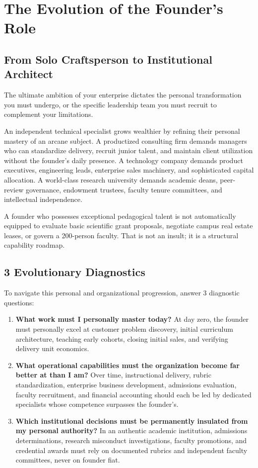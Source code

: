 \section{The Evolution of the Founder's Role}

\subsection{From Solo Craftsperson to Institutional Architect}

The ultimate ambition of your enterprise dictates the personal transformation you must undergo, or the specific leadership team you must recruit to complement your limitations.

An independent technical specialist grows wealthier by refining their personal mastery of an arcane subject. A productized consulting firm demands managers who can standardize delivery, recruit junior talent, and maintain client utilization without the founder's daily presence. A technology company demands product executives, engineering leads, enterprise sales machinery, and sophisticated capital allocation. A world-class research university demands academic deans, peer-review governance, endowment trustees, faculty tenure committees, and intellectual independence.

A founder who possesses exceptional pedagogical talent is not automatically equipped to evaluate basic scientific grant proposals, negotiate campus real estate leases, or govern a 200-person faculty. That is not an insult; it is a structural capability roadmap.

\subsection{3 Evolutionary Diagnostics}

To navigate this personal and organizational progression, answer 3 diagnostic questions:

\begin{enumerate}[leftmargin=12pt,itemsep=2.5pt,topsep=1pt,parsep=0pt]
  \item \textbf{What work must I personally master today?} At day zero, the founder must personally excel at customer problem discovery, initial curriculum architecture, teaching early cohorts, closing initial sales, and verifying delivery unit economics.
  \item \textbf{What operational capabilities must the organization become far better at than I am?} Over time, instructional delivery, rubric standardization, enterprise business development, admissions evaluation, faculty recruitment, and financial accounting should each be led by dedicated specialists whose competence surpasses the founder's.
  \item \textbf{Which institutional decisions must be permanently insulated from my personal authority?} In an authentic academic institution, admissions determinations, research misconduct investigations, faculty promotions, and credential awards must rely on documented rubrics and independent faculty committees, never on founder fiat.
\end{enumerate}

